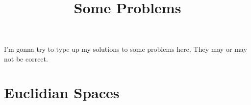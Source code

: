 \documentclass[fontsize=9pt]{article}
\title{Some Problems}
\date{}
\begin{document}
\maketitle
I'm gonna try to type up my solutions to some problems here. They may or may not be correct.
\tableofcontents
\section{Euclidian Spaces}
    
    
    
\end{document}

